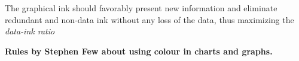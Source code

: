 The graphical ink should favorably present new information and eliminate
redundant and non-data ink without any loss of the data, thus maximizing the
\textit{data-ink ratio}






\textbf{Rules by Stephen Few about using colour in charts and graphs.}




